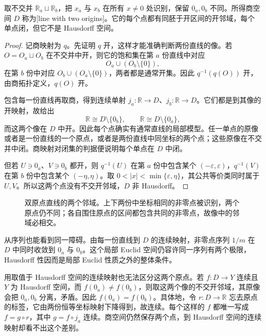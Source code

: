 \begin{example}[双原点直线]\label{g1:exm:double-origin}
	取不交并 \(\mathbb R_a\sqcup\mathbb R_b\)，把 \(x_a\) 与 \(x_b\) 在所有 \(x\ne0\) 处识别，保留 \(0_a,0_b\) 不同。所得商空间 \(D\) 称为[line with two origins]。它的每个点都有同胚于开区间的开邻域，每个单点闭，但它不是 Hausdorff 空间。
\end{example}
\begin{proof}
	记商映射为 \(q\)。先证明 \(q\) 开，这样才能准确判断两份直线的像。若 \(O=O_a\sqcup O_b\) 在不交并中开，则它的饱和集在第 \(a\) 份直线中对应
	\[
		O_a\cup(O_b\setminus\{0\}),
	\]
	在第 \(b\) 份中对应 \(O_b\cup(O_a\setminus\{0\})\)，两者都是通常开集。因此 \(q^{-1}(q(O))\) 开，由商拓扑定义，\(q(O)\) 开。

	包含每一份直线再取商，得到连续单射 \(j_a:\mathbb R\to D\)、\(j_b:\mathbb R\to D\)。它们都是到其像的开映射，故给出
	\[
		\mathbb R\cong D\setminus\{0_b\},\qquad \mathbb R\cong D\setminus\{0_a\},
	\]
	而这两个像在 \(D\) 中开。因此每个点确实有通常直线的局部模型。任一单点的原像或者是一份直线的一个原点，或者是两份直线中同坐标的两个点；这些原像在不交并中闭。商映射对闭集的判据便说明每个单点在 \(D\) 中闭。

	但若 \(U\ni0_a\)、\(V\ni0_b\) 都开，则 \(q^{-1}(U)\) 在第 \(a\) 份中包含某个 \((-\varepsilon,\varepsilon)\)，\(q^{-1}(V)\) 在第 \(b\) 份中包含某个 \((-\eta,\eta)\)。取 \(0<|x|<\min\{\varepsilon,\eta\}\)，其公共等价类同时属于 \(U,V\)。所以这两个点没有不交开邻域，\(D\) 非 Hausdorff。
\end{proof}

\begin{figure}[htbp]
	\centering
	
	\caption[双原点直线的两个邻域]{双原点直线的两个邻域。上下两份中坐标相同的非零点被识别，两个原点仍不同；各自围住原点的区间都包含共同的非零点，故像中的邻域必相交。}
	\label{g1:fig:double-origin}
\end{figure}

从序列也能看到同一障碍。由每一份直线到 \(D\) 的连续映射，非零点序列 \(1/m\) 在 \(D\) 中同时收敛到 \(0_a\) 与 \(0_b\)。这个局部 Euclid 空间仍容许同一序列有两个极限，Hausdorff 性因而是局部 Euclid 性质之外的整体条件。

用取值于 Hausdorff 空间的连续映射也无法区分这两个原点。若 \(f:D\to Y\) 连续且 \(Y\) 为 Hausdorff 空间，而 \(f(0_a)\ne f(0_b)\)，则取这两个像的不交开邻域，其原像会把 \(0_a,0_b\) 分离，矛盾。因此 \(f(0_a)=f(0_b)\)。具体地，令 \(r:D\to\mathbb R\) 忘去原点的标签，它由两份恒等坐标映射下降得到，故连续。每个这样的 \(f\) 都唯一写成 \(f=g\circ r\)，其中 \(g=f\circ j_a\) 连续。商空间仍然保存两个点，到 Hausdorff 空间的连续映射却看不出这个差别。

